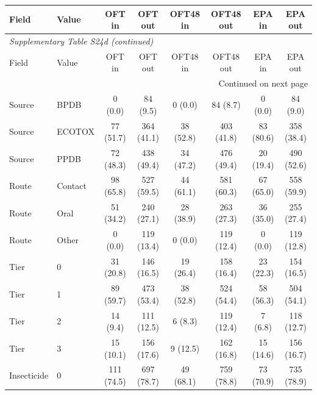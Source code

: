 \begin{longtable}{llcccccc}

\toprule Field & Value & OFT in & OFT out & OFT48 in & OFT48 out & EPA in & EPA out \\ \midrule\endfirsthead

\multicolumn{8}{l}{\textit{Supplementary Table S24d (continued)}} \\

\toprule Field & Value & OFT in & OFT out & OFT48 in & OFT48 out & EPA in & EPA out \\ \midrule\endhead

\midrule\multicolumn{8}{r}{Continued on next page}\\\endfoot\bottomrule\endlastfoot

Source & BPDB & 0 (0.0) & 84 (9.5) & 0 (0.0) & 84 (8.7) & 0 (0.0) & 84 (9.0) \\

Source & ECOTOX & 77 (51.7) & 364 (41.1) & 38 (52.8) & 403 (41.8) & 83 (80.6) & 358 (38.4) \\

Source & PPDB & 72 (48.3) & 438 (49.4) & 34 (47.2) & 476 (49.4) & 20 (19.4) & 490 (52.6) \\

Route & Contact & 98 (65.8) & 527 (59.5) & 44 (61.1) & 581 (60.3) & 67 (65.0) & 558 (59.9) \\

Route & Oral & 51 (34.2) & 240 (27.1) & 28 (38.9) & 263 (27.3) & 36 (35.0) & 255 (27.4) \\

Route & Other & 0 (0.0) & 119 (13.4) & 0 (0.0) & 119 (12.4) & 0 (0.0) & 119 (12.8) \\

Tier & 0 & 31 (20.8) & 146 (16.5) & 19 (26.4) & 158 (16.4) & 23 (22.3) & 154 (16.5) \\

Tier & 1 & 89 (59.7) & 473 (53.4) & 38 (52.8) & 524 (54.4) & 58 (56.3) & 504 (54.1) \\

Tier & 2 & 14 (9.4) & 111 (12.5) & 6 (8.3) & 119 (12.4) & 7 (6.8) & 118 (12.7) \\

Tier & 3 & 15 (10.1) & 156 (17.6) & 9 (12.5) & 162 (16.8) & 15 (14.6) & 156 (16.7) \\

Insecticide & 0 & 111 (74.5) & 697 (78.7) & 49 (68.1) & 759 (78.8) & 73 (70.9) & 735 (78.9) \\


\end{longtable}
